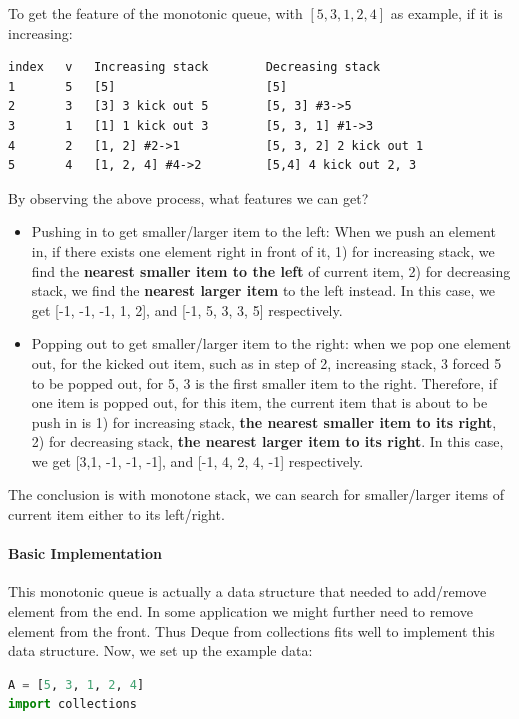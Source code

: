 \documentclass[../main.tex]{subfiles}
\begin{document}
To get the feature of the monotonic queue, with $[5, 3, 1, 2, 4]$ as example, if it is increasing:
\begin{lstlisting}[numbers=none]
index   v   Increasing stack        Decreasing stack
1       5   [5]                     [5]
2       3   [3] 3 kick out 5        [5, 3] #3->5
3       1   [1] 1 kick out 3        [5, 3, 1] #1->3
4       2   [1, 2] #2->1            [5, 3, 2] 2 kick out 1
5       4   [1, 2, 4] #4->2         [5,4] 4 kick out 2, 3
\end{lstlisting}
By observing the above process, what features we can get? 
\begin{itemize}
    \item Pushing in to get smaller/larger item to the left: When we push an element in, if there exists one element right in front of it, 1) for increasing stack, we find the \textbf{nearest smaller item to the left} of current item, 2) for decreasing stack, we find the \textbf{nearest larger item} to the left instead. In this case, we get [-1, -1, -1, 1, 2], and [-1, 5, 3, 3, 5] respectively.
    \item Popping out to get smaller/larger item to the right: when we pop one element out, for the kicked out item, such as in step of 2, increasing stack, 3 forced 5 to be popped out, for 5, 3 is the first smaller item to the right. Therefore, if one item is popped out, for this item, the current item that is about to be push in is 1) for increasing stack, \textbf{the nearest smaller item to its right}, 2) for decreasing stack, \textbf{the nearest larger item to  its right}.  In this case, we get [3,1, -1, -1, -1], and [-1, 4, 2, 4, -1] respectively.
\end{itemize}
The conclusion is with monotone stack, we can search for smaller/larger items of current item either to its left/right. 

\paragraph{Basic Implementation}
 
This monotonic queue is actually a data structure that needed to add/remove element from the end. In some application we might further need to remove element from the front. Thus Deque from collections fits well to implement this data structure. Now, we set up the example data:
\begin{lstlisting}[language=Python]
A = [5, 3, 1, 2, 4]
import collections
\end{lstlisting}
\end{document}
